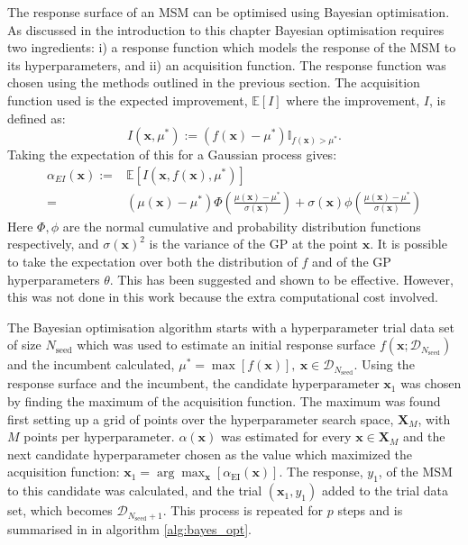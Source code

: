 The response surface of an MSM can be optimised using Bayesian optimisation. As discussed in the introduction to this chapter Bayesian optimisation requires two ingredients: i) a response function which models the response of the MSM to its hyperparameters, and ii) an acquisition function. The response function was chosen using the methods outlined in the previous section. The acquisition function used is the expected improvement, $\mathbb{E}\left[I\right]$ where the improvement, $I$, is defined as\cite{shahriariTakingHumanOut2016}:
\begin{equation}
    I(\mathbf{x}, \mu^{*}):=(f(\mathbf{x}) - \mu^{*}) \mathbb{I}_{f(\mathbf{x}) > \mu^{*}}.
\end{equation}
Taking the expectation of this for a Gaussian process gives\cite{shahriariTakingHumanOut2016}:
\begin{align}\label{eqn:msm_ei_def}
        \alpha_{EI}(\mathbf{x}) := &  \mathbb{E}\left[I(\mathbf{x}, f(\mathbf{x}), \mu^{*})\right] \\
         =  &(\mu(\mathbf{x}) - \mu^{*})\Phi\left( \frac{ \mu(\mathbf{x}) - \mu^{*} }{\sigma(\mathbf{x})} \right ) + \sigma(\mathbf{x})\phi\left( \frac{ \mu(\mathbf{x}) - \mu^{*} }{\sigma(\mathbf{x}) } \right )
\end{align}
Here $\Phi, \phi$ are the normal cumulative and probability distribution functions respectively, and $\sigma(\mathbf{x})^{2}$ is the variance of the GP at the point $\mathbf{x}$. It is possible to take the expectation over both the distribution of $f$ and of the GP hyperparameters $\theta$. This has been suggested and shown to be effective\cite{NIPS2012_4522}. However, this was not done in this work because the extra computational cost involved. 

The Bayesian optimisation algorithm starts with a hyperparameter trial data set of size $N_{\mathrm{seed}}$ which was used to estimate an initial response surface $f(\mathbf{x}; \mathcal{D}_{N_{\mathrm{seed}}})$ and the incumbent calculated, $\mu^{*} = \max{[f(\mathbf{x})]},\ \mathbf{x}\in \mathcal{D}_{N_{\mathrm{seed}}}$. Using the response surface and the incumbent, the  candidate hyperparameter $\mathbf{x}_{1}$ was chosen by finding the maximum of the acquisition function. The maximum was found first setting up a grid of points over the hyperparameter search space, $\mathbf{X}_{M}$, with $M$ points per hyperparameter.  $\alpha(\mathbf{x})$ was estimated for every $\mathbf{x}\in \mathbf{X}_{M}$ and the next candidate hyperparameter chosen as the value which maximized the acquisition function: $\mathbf{x}_{1} = \arg\max_{\mathbf{x}}\left[ \alpha_{\mathrm{EI}}(\mathbf{x})\right]$. The response, $y_{1}$, of the MSM to this candidate was calculated, and the trial $(\mathbf{x}_{1}, y_{1})$ added to the trial data set, which becomes  $\mathcal{D}_{N_{\mathrm{seed}}+1}$. This process is repeated for $p$ steps and is summarised in in algorithm \ref{alg:bayes_opt}.

